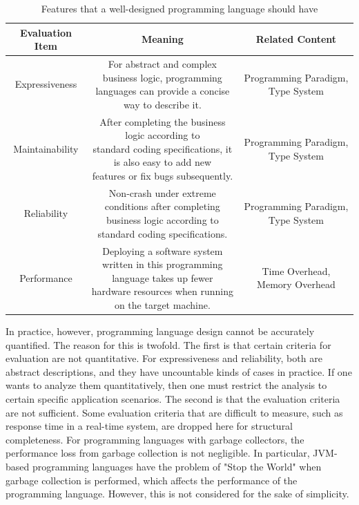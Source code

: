 \begin{table}[hb]
    \caption{Features that a well-designed programming language should have}
    \label{tab:evaluate}
    \begin{center}
        \begin{tabular}{ccc}
            \toprule
            Evaluation Item & Meaning & Related Content \\
            \midrule
            Expressiveness &
            \makecell[l]{
                For abstract and complex business logic, programming \\
                languages can provide a concise way to describe it.
            }
            & Programming Paradigm, Type System \\
            \midrule
            Maintainability &
            \makecell[l]{
                After completing the business logic according to \\
                standard coding specifications, it is also easy to add new \\ features or
                fix bugs subsequently.
            }
            & Programming Paradigm, Type System \\
            \midrule
            Reliability &
            \makecell[l]{
                Non-crash under extreme conditions after completing \\
                business logic according to standard coding specifications.
            }
            & Programming Paradigm, Type System \\
            \midrule
            Performance &
            \makecell[l]{
                Deploying a software system written in this programming \\
                language takes up fewer hardware resources when running \\ on the target
                machine.
            }
            & Time Overhead, Memory Overhead \\
            \bottomrule
        \end{tabular}
    \end{center}
\end{table}

In practice, however, programming language design cannot be accurately quantified. The reason for this is twofold. The first is that certain criteria for evaluation are not quantitative. For expressiveness and reliability, both are abstract descriptions, and they have uncountable kinds of cases in practice. If one wants to analyze them quantitatively, then one must restrict the analysis to certain specific application scenarios. The second is that the evaluation criteria are not sufficient. Some evaluation criteria that are difficult to measure, such as response time in a real-time system, are dropped here for structural completeness. For programming languages with garbage collectors, the performance loss from garbage collection is not negligible. In particular, JVM-based programming languages have the problem of "Stop the World" when garbage collection is performed, which affects the performance of the programming language. However, this is not considered for the sake of simplicity.
